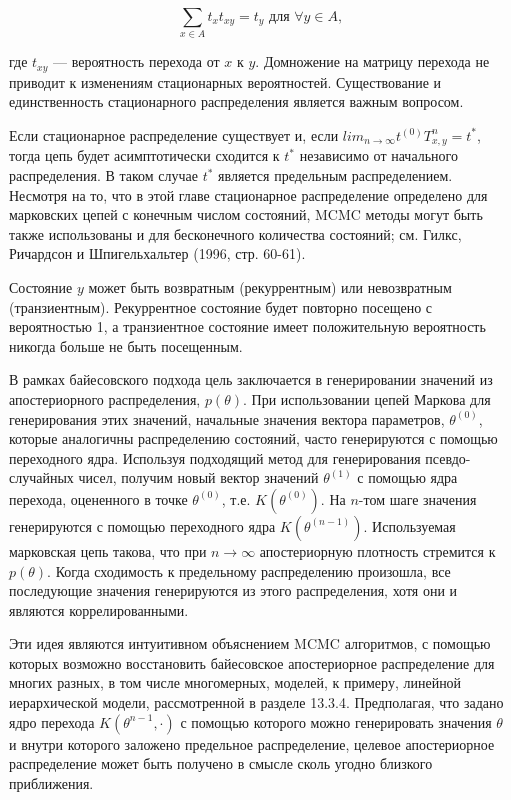 \begin{equation}
\sum_{x \in A}t_{x}t_{xy}=t_y \text{ для } \forall y \in A,
\end{equation}

где $t_{xy}$ --- вероятность перехода от $x$ к $y$. Домножение на матрицу перехода не приводит к изменениям стационарных вероятностей. Существование и единственность стационарного распределения является важным вопросом.

Если стационарное распределение существует и, если $lim_{n{\rightarrow}\infty}t^{(0)}T^{n}_{x,y}=t^*$, тогда цепь будет асимптотически сходится к $t^*$ независимо от начального распределения. В таком случае $t^*$ является предельным распределением. Несмотря на то, что в этой главе стационарное распределение определено для марковских цепей с конечным числом состояний, MCMC методы могут быть также использованы и для бесконечного количества состояний; см. Гилкс, Ричардсон и Шпигельхальтер (1996, стр. 60-61).

Состояние $y$ может быть возвратным (рекуррентным) или невозвратным (транзиентным). Рекуррентное состояние будет повторно посещено с вероятностью 1, а транзиентное состояние имеет положительную вероятность никогда больше не быть посещенным. 

В рамках байесовского подхода цель заключается в генерировании  значений из апостериорного  распределения, $p(\theta)$. При использовании цепей Маркова для генерирования этих значений, начальные значения вектора параметров, $\theta^{(0)}$, которые аналогичны распределению состояний, часто генерируются с помощью переходного ядра.  Используя подходящий метод для генерирования псевдо-случайных чисел, получим новый вектор значений $\theta^{(1)}$ с помощью ядра перехода, оцененного в точке $\theta^{(0)}$, т.е. $K(\theta^{(0)})$. На $n$-том шаге значения генерируются с помощью переходного ядра $K(\theta^{(n-1)})$. Используемая марковская цепь такова, что при $n{\rightarrow}\infty$ апостериорную плотность  стремится к $p(\theta)$. Когда сходимость к предельному распределению произошла, все последующие значения генерируются из этого распределения, хотя они и являются коррелированными.

Эти идея являются интуитивном объяснением  MCMC алгоритмов, с помощью которых возможно восстановить байесовское апостериорное распределение для многих разных, в том числе многомерных, моделей, к примеру, линейной иерархической модели, рассмотренной в разделе 13.3.4. Предполагая, что задано ядро перехода $K(\theta^{n-1},\cdot)$ с помощью которого можно генерировать значения $\theta$ и внутри которого заложено предельное распределение, целевое апостериорное распределение может быть получено в смысле сколь угодно близкого приближения.

